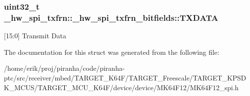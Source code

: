 \subsubsection[{\texorpdfstring{T\+X\+D\+A\+TA}{TXDATA}}]{\setlength{\rightskip}{0pt plus 5cm}uint32\+\_\+t \+\_\+hw\+\_\+spi\+\_\+txfrn\+::\+\_\+hw\+\_\+spi\+\_\+txfrn\+\_\+bitfields\+::\+T\+X\+D\+A\+TA}\hypertarget{struct__hw__spi__txfrn_1_1__hw__spi__txfrn__bitfields_ada641485a2d448406b47102bb5aa8714}{}\label{struct__hw__spi__txfrn_1_1__hw__spi__txfrn__bitfields_ada641485a2d448406b47102bb5aa8714}
\mbox{[}15\+:0\mbox{]} Transmit Data 

The documentation for this struct was generated from the following file\+:\begin{DoxyCompactItemize}
\item 
/home/erik/proj/piranha/code/piranha-\/ptc/src/receiver/mbed/\+T\+A\+R\+G\+E\+T\+\_\+\+K64\+F/\+T\+A\+R\+G\+E\+T\+\_\+\+Freescale/\+T\+A\+R\+G\+E\+T\+\_\+\+K\+P\+S\+D\+K\+\_\+\+M\+C\+U\+S/\+T\+A\+R\+G\+E\+T\+\_\+\+M\+C\+U\+\_\+\+K64\+F/device/device/\+M\+K64\+F12/M\+K64\+F12\+\_\+spi.\+h\end{DoxyCompactItemize}
